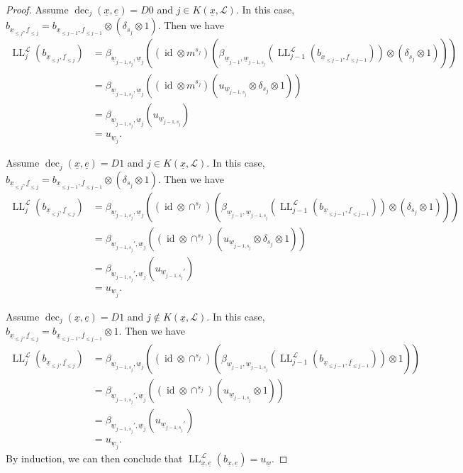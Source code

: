 \documentclass{amsart}
\newcommand{\scrL}{\mathcal{L}}
\DeclareMathOperator{\id}{id}
\DeclareMathOperator{\LL}{LL}
\DeclareMathOperator{\dec}{dec}
\newcommand{\ue}{\underline{e}}
\newcommand{\uf}{\underline{f}}
\newcommand{\uw}{\underline{w}}
\newcommand{\ux}{\underline{x}}
\theoremstyle{definition}
\numberwithin{equation}{subsection}
\begin{document}
\begin{proof}
    Assume $\dec_j (\ux, \ue) = D0$ and $j \in K(\ux, \scrL)$. In this case, $b_{\ux_{\leq j}, \uf_{\leq j}} = b_{\ux_{\leq j-1}, \uf_{\leq j-1}} \otimes (\delta_{s_j} \otimes 1)$.
    Then we have
    \begin{align*}
        \LL_j^{\scrL} (b_{\ux_{\leq j}, \uf_{\leq j}}) &= \beta_{\uw_{j-1,s_j}, \uw_j} \left( (\id \otimes m^{s_j}) \left( \beta_{\uw_{j-1}, \uw_{j-1,s_j}} \left( \LL_{j-1}^{\scrL} (b_{\ux_{\leq j-1}, \uf_{\leq j-1}}) \right) \otimes (\delta_{s_j} \otimes 1) \right) \right) \\
        &= \beta_{\uw_{j-1,s_j}, \uw_j} \left( (\id \otimes m^{s_j}) \left( u_{\uw_{j-1,s_j}} \otimes \delta_{s_j} \otimes 1 \right) \right) \\
        &= \beta_{\uw_{j-1,s_j}, \uw_j} \left( u_{\uw_{j-1,s_j}}\right) \\
        &= u_{\uw_j}.
    \end{align*}

    Assume $\dec_j (\ux, \ue) = D1$ and $j \in K(\ux, \scrL)$. In this case, $b_{\ux_{\leq j}, \uf_{\leq j}} = b_{\ux_{\leq j-1}, \uf_{\leq j-1}} \otimes (\delta_{s_j} \otimes 1)$.
    Then we have
    \begin{align*}
        \LL_j^{\scrL} (b_{\ux_{\leq j}, \uf_{\leq j}}) &= \beta_{\uw_{j-1,s_j}, \uw_j} \left( (\id \otimes \cap^{s_j}) \left( \beta_{\uw_{j-1}, \uw_{j-1,s_j}} \left( \LL_{j-1}^{\scrL} (b_{\ux_{\leq j-1}, \uf_{\leq j-1}}) \right) \otimes (\delta_{s_j} \otimes 1) \right) \right) \\
        &= \beta_{\uw_{j-1,s_j}', \uw_j} \left( (\id \otimes \cap^{s_j}) \left( u_{\uw_{j-1,s_j}} \otimes \delta_{s_j} \otimes 1 \right) \right) \\
        &= \beta_{\uw_{j-1,s_j}', \uw_j} \left( u_{\uw_{j-1,s_j}'}\right) \\
        &= u_{\uw_j}.
    \end{align*}

    Assume $\dec_j (\ux, \ue) = D1$ and $j \notin K(\ux, \scrL)$. In this case, $b_{\ux_{\leq j}, \uf_{\leq j}} = b_{\ux_{\leq j-1}, \uf_{\leq j-1}} \otimes 1$.
    Then we have
    \begin{align*}
        \LL_j^{\scrL} (b_{\ux_{\leq j}, \uf_{\leq j}}) &= \beta_{\uw_{j-1,s_j}, \uw_j} \left( (\id \otimes \cap^{s_j}) \left( \beta_{\uw_{j-1}, \uw_{j-1,s_j}} \left( \LL_{j-1}^{\scrL} (b_{\ux_{\leq j-1}, \uf_{\leq j-1}}) \right) \otimes 1 \right) \right) \\
        &= \beta_{\uw_{j-1,s_j}', \uw_j} \left( (\id \otimes \cap^{s_j}) \left( u_{\uw_{j-1,s_j}} \otimes 1 \right) \right) \\
        &= \beta_{\uw_{j-1,s_j}', \uw_j} \left( u_{\uw_{j-1,s_j}'}\right) \\
        &= u_{\uw_j}.
    \end{align*}
    By induction, we can then conclude that $\LL_{\ux, \ue}^{\scrL} (b_{\ux, \ue}) = u_{\uw}$.


\end{proof}
\end{document}
